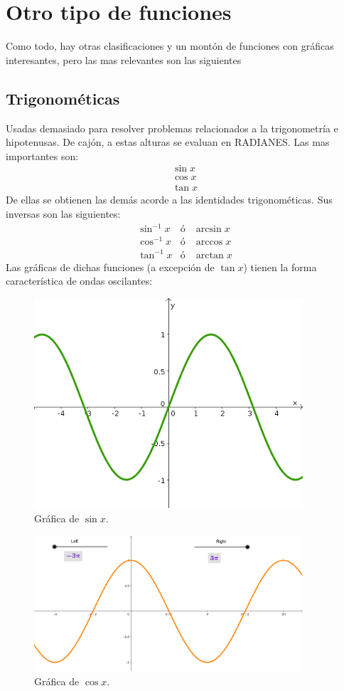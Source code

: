 \documentclass[letterpaper, 12pt]{article}
\begin{document}
        \section{Otro tipo de funciones}
        Como todo, hay otras clasificaciones y un montón de funciones con gráficas interesantes, pero las mas relevantes son las siguientes
        \subsection{Trigonométicas}
        Usadas demasiado para resolver problemas relacionados a la trigonometría e hipotenusas. De cajón, a estas alturas se evaluan en RADIANES. Las mas importantes son:
        \[\begin{matrix}
            \sin x\\
            \cos x\\
            \tan x
        \end{matrix}\]
        De ellas se obtienen las demás acorde a las identidades trigonométicas. Sus inversas son las siguientes:
        \[\begin{matrix}
            \sin ^{-1}x &\text{ó}&\arcsin x\\
            \cos ^{-1}x &\text{ó}&\arccos x\\
            \tan ^{-1}x &\text{ó}&\arctan x
        \end{matrix}\]
        Las gráficas de dichas funciones (a excepción de \(\tan x\)) tienen la forma característica de ondas oscilantes:
        \begin{figure}[H]
            \centering
            \includegraphics[width=10cm]{sinx.png}
            \caption{Gráfica de \(\sin x\).}
        \end{figure}
        \begin{figure}[H]
            \centering
            \includegraphics[width=10cm]{cosx.png}
            \caption{Gráfica de \(\cos x\).}
        \end{figure}
\end{document}

